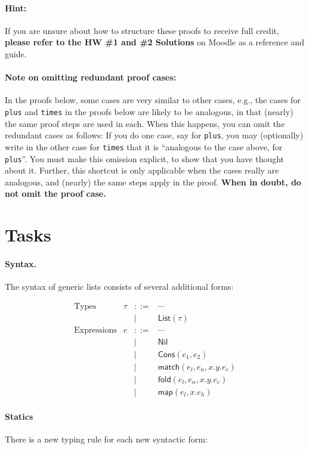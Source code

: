 \documentclass[11pt]{article}
\newcommand{\typ}[0]{\tau}
\newcommand{\List}[1]{\textsf{List}(#1)}
\begin{document}
\paragraph{Hint:}
If you are unsure about how to structure these proofs to receive full credit, 
\textbf{please refer to the HW \#1 and \#2 Solutions} on Moodle as a reference and guide.

\paragraph{Note on omitting redundant proof cases:} In the proofs below, some cases are very
similar to other cases, e.g., the cases for \texttt{plus} and
\texttt{times} in the proofs below are likely to be analogous, in that
(nearly) the same proof steps are used in each.
%
When this happens, you can omit the redundant cases as follows: If you
do one case, say for \texttt{plus}, you may (optionally) write in the
other case for \texttt{times} that it is ``analogous to the case
above, for \texttt{plus}''.  You must make this omission explicit, to
show that you have thought about it.  Further, this shortcut is only
applicable when the cases really are analogous, and (nearly) the same
steps apply in the proof.  \textbf{When in doubt, do not omit the
  proof case.}

\section*{Tasks}

\paragraph{Syntax.} The syntax of generic lists consists of several additional forms:

\[
\begin{array}{lllll}
\textrm{Types} &
\typ & ::= & \cdots
\\
    && | & \List{\typ}
\\[2mm]
\textrm{Expressions} &
e & ::= & \cdots 
\\
 &&|& \textsf{Nil}
\\
 &&|&      \textsf{Cons}(e_1, e_2)
\\
 &&|& \textsf{match}(e_l, e_n, x.y.e_c)
\\
 &&|& \textsf{fold}(e_l, e_n, x.y.e_c)
\\
 &&|& \textsf{map}(e_l, x.e_h)
\end{array}
\]

\paragraph{Statics} There is a new typing rule for each new syntactic form:
\end{document}

